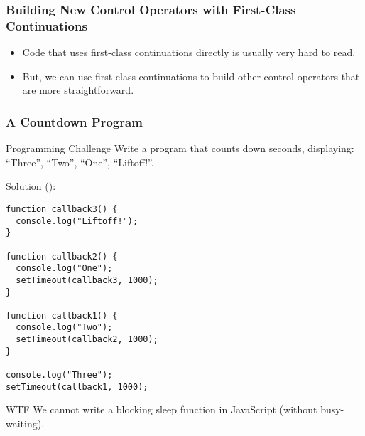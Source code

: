 \documentclass[8pt,pdf,handout]{beamer}
\begin{document}
\begin{frame}[fragile]
\frametitle{Building New Control Operators with First-Class Continuations}

\begin{itemize}

  \item Code that uses first-class continuations directly is usually very hard
  to read.

  \item But, we can use first-class continuations to build other control
  operators that are more straightforward.

\end{itemize}

\end{frame}

\begin{frame}[fragile]
\frametitle{A Countdown Program}

\begin{block}{Programming Challenge}
Write a program that counts down seconds, displaying: ``Three'', ``Two'', ``One'', ``Liftoff!''.
\end{block}

\pause

Solution ():
\begin{lstlisting}
function callback3() {
  console.log("Liftoff!");
}

function callback2() {
  console.log("One");
  setTimeout(callback3, 1000);
}

function callback1() {
  console.log("Two");
  setTimeout(callback2, 1000);
}

console.log("Three");
setTimeout(callback1, 1000);
\end{lstlisting}

\pause

\begin{alertblock}{WTF}
We cannot write a blocking sleep function in JavaScript (without busy-waiting).
\end{alertblock}

\end{frame}
\end{document}
